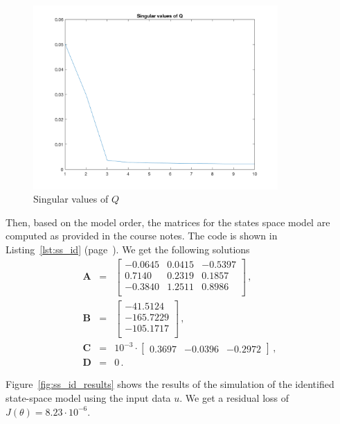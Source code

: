 \begin{figure}[h]
	\centering
	\includegraphics[height=7cm]{figures/singular.png}
	\caption{Singular values of $Q$}\label{fig:singular}
\end{figure}


Then, based on the model order, the matrices for the states space model are computed as provided in the course notes.
The code is shown in Listing~\ref{lst:ss_id} (page~\pageref{lst:ss_id}).
We get the following solutions
\begin{eqnarray}
	\mathbf{A} &=& \begin{bmatrix}
			-0.0645  & 0.0415 & -0.5397\\
			 0.7140  & 0.2319 &  0.1857\\
			-0.3840  & 1.2511 &  0.8986\\
	\end{bmatrix}\,,\\
	\mathbf{B} &=& \begin{bmatrix}
		 -41.5124\\
		-165.7229\\
		-105.1717\\
	\end{bmatrix}\,,\\
	\mathbf{C} &=& 10^{-3} \cdot \begin{bmatrix}
	    0.3697 & -0.0396 & -0.2972
	\end{bmatrix}\, ,\\
	\mathbf{D} &=& 0\, .
\end{eqnarray}

Figure~\ref{fig:ss_id_results} shows the results of the simulation of the identified state-space model using the input data $u$.
We get a residual loss of $J(\theta) = 8.23 \cdot 10^{-6}$.

